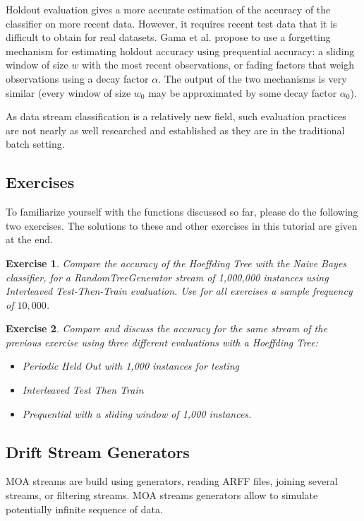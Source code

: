 \documentclass[a4paper,12pt]{article}
\newtheorem{exercise}{Exercise}{}
\begin{document}
Holdout evaluation gives a more accurate estimation of the accuracy of the classifier on more recent data. However, it requires recent test data that it is difficult to obtain for real datasets.
Gama et al. 
propose to use a forgetting mechanism for estimating holdout accuracy using
prequential
accuracy: a sliding window of size $w$ with the most recent
observations, or fading factors that weigh observations using a decay
factor $\alpha$. 
The output of the two mechanisms is very
similar (every window of size $w_0$ may be approximated by some decay
factor $\alpha_0$).

As data stream classification is a relatively new field, such evaluation 
practices are not nearly as well researched and established as they are
in the traditional batch setting. 


\subsection{Exercises}

To familiarize yourself with the functions discussed so far, please do the following
two exercises. The solutions to these and other exercises in this tutorial are given
at the end.

\begin{exercise}
Compare the accuracy of the Hoeffding Tree with the Naive Bayes classifier, for a RandomTreeGenerator stream of 1,000,000 instances using Interleaved Test-Then-Train evaluation.
Use for all exercises a sample frequency of $10,000$.
\end{exercise}
\begin{exercise}
Compare and discuss the accuracy for the same stream of the previous exercise using three different evaluations with a Hoeffding Tree:
\begin{itemize}
 \item Periodic Held Out with 1,000 instances for testing
 \item Interleaved Test Then Train
 \item Prequential with a sliding window of 1,000 instances.
\end{itemize}
\end{exercise}

\subsection{Drift Stream Generators}

MOA streams are build using generators, reading ARFF files, joining several streams, or filtering streams.
MOA streams generators allow to simulate potentially infinite sequence of data.
\end{document}
